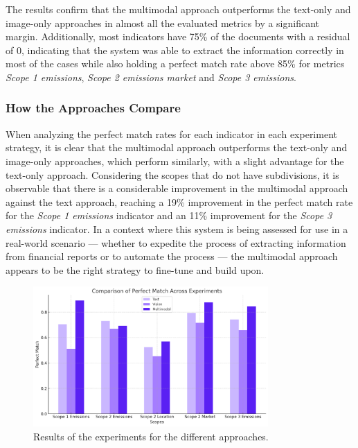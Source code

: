 \documentclass[english, 12pt, a4paper, elec, utf8, a-2b, online]{aaltothesis}
\begin{document}
The results confirm that the multimodal approach outperforms the text-only and image-only approaches in almost all the evaluated metrics by a significant margin.
Additionally, most indicators have 75\% of the documents with a residual of 0, indicating that the system was able to extract the information correctly in most of the cases while also holding a perfect match rate above 85\% for metrics \textit{Scope 1 emissions}, \textit{Scope 2 emissions market} and \textit{Scope 3 emissions}.

\subsubsection{How the Approaches Compare}

When analyzing the perfect match rates for each indicator in each experiment strategy, it is clear that the multimodal approach outperforms the text-only and image-only approaches, which perform similarly, with a slight advantage for the text-only approach.
Considering the scopes that do not have subdivisions, it is observable that there is a considerable improvement in the multimodal approach against the text approach, reaching a 19\% improvement in the perfect match rate for the \textit{Scope 1 emissions} indicator and an 11\% improvement for the \textit{Scope 3 emissions} indicator.
In a context where this system is being assessed for use in a real-world scenario --- whether to expedite the process of extracting information from financial reports or to automate the process --- the multimodal approach appears to be the right strategy to fine-tune and build upon.

\begin{figure}[H]
    \centering
    \includegraphics[width=0.8\textwidth]{images/perfect_match_comparison.png}
    \caption{Results of the experiments for the different approaches.}
    \label{fig:perfect_match_comparison}
\end{figure}
\end{document}
